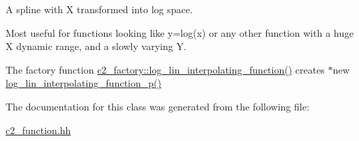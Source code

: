A spline with X transformed into log space.

Most useful for functions looking like y=log(x) or any other function with a huge X dynamic range, and a slowly varying Y. 

The factory function \hyperlink{classc2__factory_afecb73857f9c060b6e32be187705b573}{c2\-\_\-factory\-::log\-\_\-lin\-\_\-interpolating\-\_\-function()} creates $\ast$new \hyperlink{classlog__lin__interpolating__function__p_a7275a4e792cb3895f43d84a74b03116f}{log\-\_\-lin\-\_\-interpolating\-\_\-function\-\_\-p()} 

The documentation for this class was generated from the following file\-:\begin{DoxyCompactItemize}
\item 
\hyperlink{c2__function_8hh}{c2\-\_\-function.\-hh}\end{DoxyCompactItemize}
